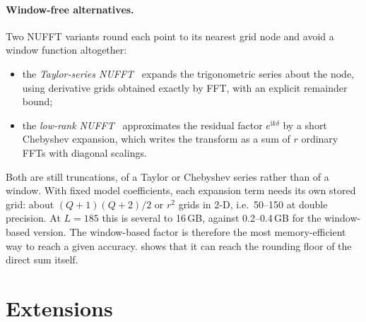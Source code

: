 \documentclass[11pt,a4paper]{article}
\theoremstyle{remark}
\begin{document}
\paragraph{Window-free alternatives.} Two NUFFT variants round each point to its nearest grid node and avoid a
window function altogether:
\begin{itemize}
\item the \emph{Taylor-series NUFFT}~\cite{anderson1996} expands the trigonometric series about the node, using
  derivative grids obtained exactly by FFT, with an explicit remainder bound;
\item the \emph{low-rank NUFFT}~\cite{ruiz2018} approximates the residual factor $e^{\mathrm ik\delta}$ by a short
  Chebyshev expansion, which writes the transform as a sum of $r$ ordinary FFTs with diagonal scalings.
\end{itemize}
Both are still truncations, of a Taylor or Chebyshev series rather than of a window. With fixed model
coefficients, each expansion term needs its own stored grid: about $(Q+1)(Q+2)/2$ or $r^2$ grids in 2-D,
i.e.\ 50--150 at double precision. At $L=185$ this is several to 16\,GB, against 0.2--0.4\,GB for the window-based
version. The window-based factor is therefore the most memory-efficient way to reach a given accuracy.
 shows that it can reach the rounding floor of the direct sum itself.

\section{Extensions}\label{sec:extensions}
\end{document}
